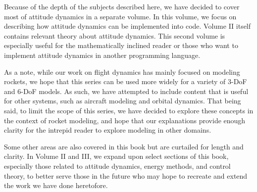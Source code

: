 \documentclass[10pt, openany, titlepage]{book}
\theoremstyle{definition}
\begin{document}
Because of the depth of the subjects described here, we have decided to cover most of attitude dynamics in a separate volume. In this volume, we focus on describing how attitude dynamics can be implemented into code. Volume II itself contains relevant theory about attitude dynamics. This second volume is especially useful for the mathematically inclined reader or those who want to implement attitude dynamics in another programming language.

As a note, while our work on flight dynamics has mainly focused on modeling rockets, we hope that this series can be used more widely for a variety of 3-DoF and 6-DoF models. As such, we have attempted to include content that is useful for other systems, such as aircraft modeling and orbital dynamics. That being said, to limit the scope of this series, we have decided to explore these concepts in the context of rocket modeling, and hope that our explanations provide enough clarity for the intrepid reader to explore modeling in other domains.

Some other areas are also covered in this book but are curtailed for length and clarity. In Volume II and III, we expand upon select sections of this book, especially those related to attitude dynamics, energy methods, and control theory, to better serve those in the future who may hope to recreate and extend the work we have done heretofore.


\end{document}
